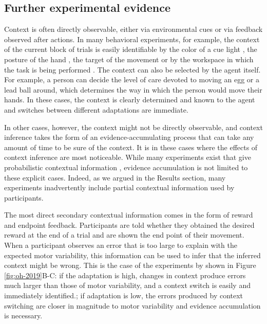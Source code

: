 \documentclass[a4paper,doc,floatsintext,natbib]{apa6}
\def \fref #1{Figure \ref{#1}}     %
\begin{document}
\subsection{Further experimental evidence}
Context is often directly observable, either via environmental cues or via feedback observed after actions. In many behavioral experiments, for example, the context of the current block of trials is easily identifiable by the color of a cue light \citep[e.g.][]{Ethier_Spontaneous_2008}, the posture of the hand \citep[e.g.][]{Gandolfo_Motor_1996}, the target of the movement \citep[e.g.][]{Lee_Dual_2009} or by the workspace in which the task is being performed \citep[e.g.][]{Shadmehr_Adaptive_1994}. The context can also be selected by the agent itself. For example, a person can decide the level of care devoted to moving an egg or a lead ball around, which determines the way in which the person would move their hands. In these cases, the context is clearly determined and known to the agent and switches between different adaptations are immediate.

In other cases, however, the context might not be directly observable, and context inference takes the form of an evidence-accumulating process that can take any amount of time to be sure of the context. It is in these cases where the effects of context inference are most noticeable. While many experiments exist that give probabilistic contextual information \cite[e.g.][]{Scholz_uncontrolled_1999,Behrens_Learning_2007,Nassar_Dissociable_2019}, evidence accumulation is not limited to these explicit cases. Indeed, as we argued in the Results section, many experiments inadvertently include partial contextual information used by participants.

The most direct secondary contextual information comes in the form of reward and endpoint feedback. Participants are told whether they obtained the desired reward at the end of a trial and are shown the end point of their movement. When a participant observes an error that is too large to explain with the expected motor variability, this information can be used to infer that the inferred context might be wrong. This is the case of the experiments by \cite{Oh_Minimizing_2019} shown in \fref{fig:oh-2019}B-C: if the adaptation is high, changes in context produce errors much larger than those of motor variability, and a context switch is easily and immediately identified.; if adaptation is low, the errors produced by context switching are closer in magnitude to motor variability and evidence accumulation is necessary.
\end{document}

